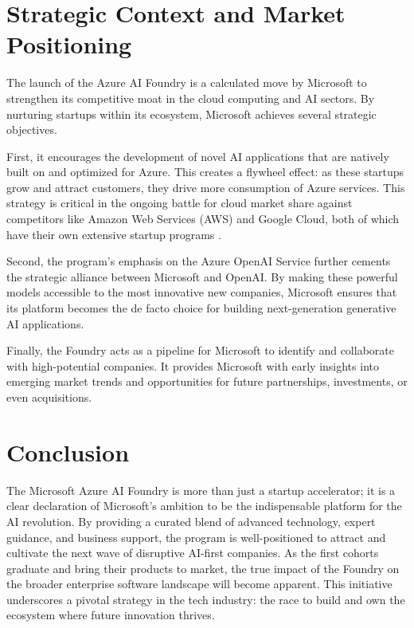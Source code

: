 \documentclass[11pt, a4paper]{article}
\begin{document}
\section{Strategic Context and Market Positioning}
The launch of the Azure AI Foundry is a calculated move by Microsoft to strengthen its competitive moat in the cloud computing and AI sectors. By nurturing startups within its ecosystem, Microsoft achieves several strategic objectives.

First, it encourages the development of novel AI applications that are natively built on and optimized for Azure. This creates a flywheel effect: as these startups grow and attract customers, they drive more consumption of Azure services. This strategy is critical in the ongoing battle for cloud market share against competitors like Amazon Web Services (AWS) and Google Cloud, both of which have their own extensive startup programs \cite{forbes_context}.

Second, the program's emphasis on the Azure OpenAI Service further cements the strategic alliance between Microsoft and OpenAI. By making these powerful models accessible to the most innovative new companies, Microsoft ensures that its platform becomes the de facto choice for building next-generation generative AI applications.

Finally, the Foundry acts as a pipeline for Microsoft to identify and collaborate with high-potential companies. It provides Microsoft with early insights into emerging market trends and opportunities for future partnerships, investments, or even acquisitions.

\section{Conclusion}
The Microsoft Azure AI Foundry is more than just a startup accelerator; it is a clear declaration of Microsoft's ambition to be the indispensable platform for the AI revolution. By providing a curated blend of advanced technology, expert guidance, and business support, the program is well-positioned to attract and cultivate the next wave of disruptive AI-first companies. As the first cohorts graduate and bring their products to market, the true impact of the Foundry on the broader enterprise software landscape will become apparent. This initiative underscores a pivotal strategy in the tech industry: the race to build and own the ecosystem where future innovation thrives.
\end{document}
